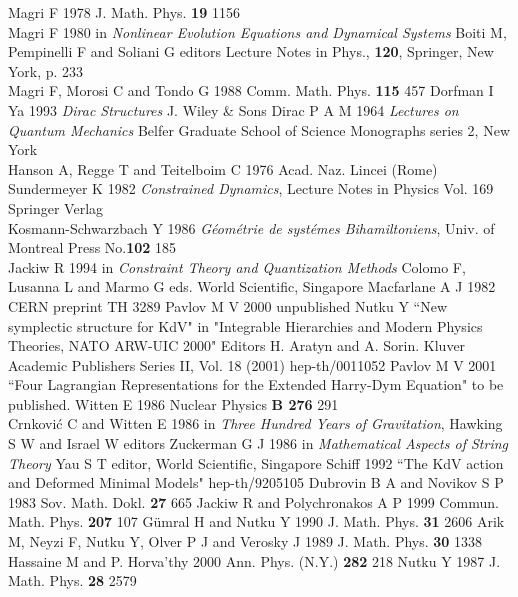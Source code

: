 \documentclass[a4paper,12pt]{article}
\begin{document}
\begin{thebibliography}{99}
 Magri F 1978 J. Math. Phys. {\bf 19} 1156 \\
Magri F 1980 in {\it Nonlinear Evolution Equations and Dynamical
Systems} Boiti M, Pempinelli F and Soliani G editors Lecture Notes
in Phys., {\bf 120}, Springer, New York, p. 233 \\ Magri F, Morosi
C and Tondo G 1988 Comm. Math. Phys. {\bf 115} 457
 Dorfman I Ya 1993 {\it Dirac Structures} J. Wiley \& Sons
 Dirac P A M 1964 {\it Lectures on Quantum Mechanics}
Belfer Graduate School of Science Monographs series 2, New York \\
Hanson A, Regge T and Teitelboim C 1976 Acad. Naz. Lincei (Rome)
\\ Sundermeyer K 1982 {\it Constrained Dynamics}, Lecture Notes in
Physics Vol. 169 Springer Verlag  \\
Kosmann-Schwarzbach Y 1986 {\it G\'eom\'etrie de syst\'emes
Bihamilton\-iens}, Univ. of Montreal Press No.{\bf 102} 185\\
Jackiw R 1994 in {\it Constraint Theory and Quantization Methods}
Colomo F, Lusanna L and Marmo G eds. World Scientific, Singapore
  Macfarlane A J 1982 CERN preprint TH 3289
 Pavlov M V 2000 unpublished
 Nutku Y ``New symplectic structure for KdV" in
"Integrable Hierarchies and Modern Physics Theories, NATO ARW-UIC
2000" Editors H. Aratyn and A. Sorin. Kluver Academic Publishers
Series II, Vol. 18 (2001)  hep-th/0011052
 Pavlov M V 2001 ``Four Lagrangian Representations
for the Extended Harry-Dym Equation" to be published.
 Witten E 1986 Nuclear Physics {\bf B 276} 291 \\
Crnkovi\'{c} C and Witten E 1986 in {\it Three Hundred Years
of Gravitation}, Hawking S W and Israel W editors
 Zuckerman G J 1986 in {\it Mathematical Aspects of String
Theory} Yau S T editor, World Scientific, Singapore
 Schiff 1992 ``The KdV action and Deformed Minimal Models"
 hep-th/9205105
 Dubrovin B A and Novikov S P 1983 Sov. Math. Dokl. {\bf 27}
 665
 Jackiw R and Polychronakos  A P 1999 Commun. Math.
Phys. {\bf 207} 107
 G\"umral H and Nutku Y 1990 J. Math. Phys. {\bf 31} 2606
 Arik M, Neyzi F, Nutku Y, Olver P J and Verosky J
1989 J. Math. Phys. {\bf 30} 1338
 Hassaine M and P. Horva'thy 2000 Ann. Phys. (N.Y.) {\bf
282} 218
 Nutku Y 1987 J. Math. Phys. {\bf 28}  2579

\end{thebibliography}
\end{document}
